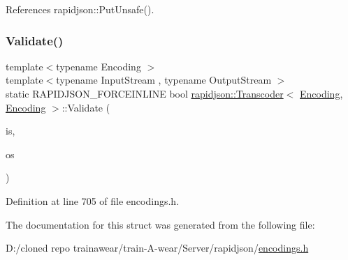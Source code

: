 References rapidjson\+::\+Put\+Unsafe().

\mbox{\label{structrapidjson_1_1_transcoder_3_01_encoding_00_01_encoding_01_4_ab95578d89524b757c72c246e7e663417}} 
\subsubsection{\texorpdfstring{Validate()}{Validate()}}
{\footnotesize\ttfamily template$<$typename Encoding $>$ \\
template$<$typename Input\+Stream , typename Output\+Stream $>$ \\
static R\+A\+P\+I\+D\+J\+S\+O\+N\+\_\+\+F\+O\+R\+C\+E\+I\+N\+L\+I\+NE bool \mbox{\hyperlink{structrapidjson_1_1_transcoder}{rapidjson\+::\+Transcoder}}$<$ \mbox{\hyperlink{classrapidjson_1_1_encoding}{Encoding}}, \mbox{\hyperlink{classrapidjson_1_1_encoding}{Encoding}} $>$\+::Validate (\begin{DoxyParamCaption}\item[{Input\+Stream \&}]{is,  }\item[{Output\+Stream \&}]{os }\end{DoxyParamCaption})\hspace{0.3cm}{\ttfamily [static]}}



Definition at line 705 of file encodings.\+h.


\begin{DoxyCode}{0}

\end{DoxyCode}


The documentation for this struct was generated from the following file\+:\begin{DoxyCompactItemize}
\item 
D\+:/cloned repo trainawear/train-\/\+A-\/wear/\+Server/rapidjson/\mbox{\hyperlink{encodings_8h}{encodings.\+h}}\end{DoxyCompactItemize}
